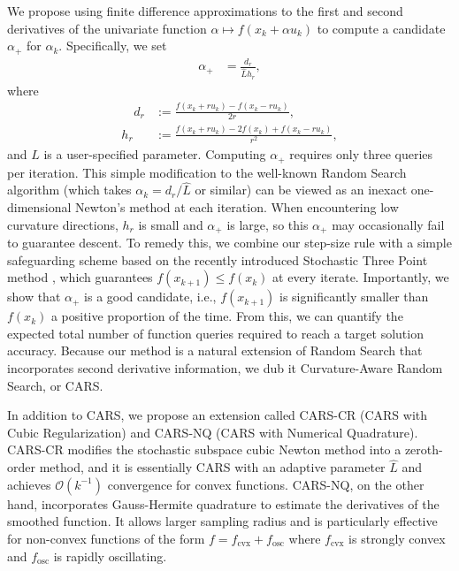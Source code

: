 We propose using finite difference approximations to the first and second derivatives of the univariate function $\alpha \mapsto f(x_k +\alpha u_k)$ to compute a candidate $\alpha_{+}$ for $\alpha_k$. Specifically, we set
\begin{align*}
    \alpha_{+} & = \frac{d_r}{\hat{L}h_r},
\end{align*}
where
\begin{align}
    \quad d_{r} & := \frac{f(x_k+r u_k) - f(x_k-r u_k)}{2r},            \label{eq: FD def d_r}\\
    h_{r}       & := \frac{f(x_k+r u_k) - 2f(x_k) + f(x_k-r u_k)}{r^2}, \label{eq: FD def h_r}
\end{align}
and $\hat{L}$ is a user-specified parameter. Computing $\alpha_+$ requires only three queries per iteration. This simple modification to the well-known Random Search algorithm \cite{ghadimi2013stochastic,nesterov2017random} (which takes $\alpha_k = d_r/\hat{L}$ or similar) can be viewed as an inexact one-dimensional Newton's method at each iteration. When encountering low curvature directions, $h_r$ is small and $\alpha_{+}$ is large, so this $\alpha_{+}$ may occasionally fail to guarantee descent. To remedy this, we combine our step-size rule with a simple safeguarding scheme based on the recently introduced Stochastic Three Point method \cite{bergou2020stochastic}, which guarantees $f(x_{k+1}) \leq f(x_k)$ at every iterate. Importantly, we show that $\alpha_{+}$ is a good candidate, i.e., $f(x_{k+1})$ is significantly smaller than $f(x_k)$ a positive proportion of the time. From this, we can quantify the expected total number of function queries required to reach a target solution accuracy. Because our method is a natural extension of Random Search that incorporates second derivative information, we dub it Curvature-Aware Random Search, or CARS.



In addition to CARS, we propose an extension called CARS-CR (CARS with Cubic Regularization) and CARS-NQ (CARS with Numerical Quadrature). CARS-CR modifies the stochastic subspace cubic Newton method \cite{pmlr-v119-hanzely20a} into a zeroth-order method, and it is essentially CARS with an adaptive parameter $\hat{L}$ and achieves $\mathcal{O}(k^{-1})$ convergence for convex functions. CARS-NQ, on the other hand, incorporates Gauss-Hermite quadrature to estimate the derivatives of the smoothed function. It allows larger sampling radius and is particularly effective for non-convex functions of the form $f = f_{\mathrm{cvx}} + f_{\mathrm{osc}}$ where $f_{\mathrm{cvx}}$ is strongly convex and $f_{\mathrm{osc}}$ is rapidly oscillating.


